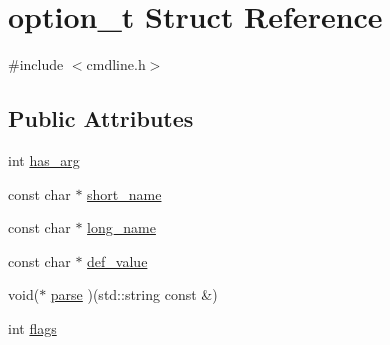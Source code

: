 \hypertarget{structoption__t}{\section{option\-\_\-t Struct Reference}
\label{structoption__t}
}


{\ttfamily \#include $<$cmdline.\-h$>$}

\subsection*{Public Attributes}
\begin{DoxyCompactItemize}
\item 
int \hyperlink{structoption__t_a8479bb3922ab98a96bd7c371add56d1a}{has\-\_\-arg}
\item 
const char $\ast$ \hyperlink{structoption__t_a5932f8523cf09216fe3522b12b87c435}{short\-\_\-name}
\item 
const char $\ast$ \hyperlink{structoption__t_a5932f4026fec602c6d0b31178177a51e}{long\-\_\-name}
\item 
const char $\ast$ \hyperlink{structoption__t_a7c8c8055faed271cb82427677e40c6a2}{def\-\_\-value}
\item 
void($\ast$ \hyperlink{structoption__t_a1329dfa63fabe96e7a2b00b254b3d17a}{parse} )(std\-::string const \&)
\item 
int \hyperlink{structoption__t_af9aedcd1623bae58760de4de2ce99234}{flags}
\end{DoxyCompactItemize}



